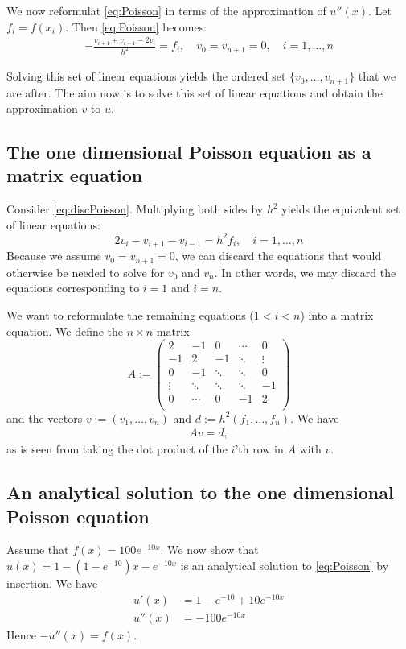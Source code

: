 \documentclass[a4paper,10pt]{scrartcl}\sloppy
\theoremstyle{definition}
\begin{document}
We now reformulat \cref{eq:Poisson} in terms of  the approximation of $u''(x)$. Let  $f_i=f(x_i)$. Then \cref{eq:Poisson} becomes:
\begin{align}\label{eq:discPoisson}
-\frac{v_{i+1}+v_{i-1}-2v_i}{h^2}=f_i, \quad v_0= v_{n+1} = 0, \quad i=1,\ldots, n
\end{align}

\noindent Solving this set of linear equations yields the ordered set $\{v_0,\ldots,v_{n+1}\}$ that we are after. The aim now is to solve this set of linear equations and obtain the approximation $v$ to $u$.

\subsection{The one dimensional Poisson equation as a matrix equation}
\noindent  Consider \cref{eq:discPoisson}. Multiplying both sides by $h^2$ yields the equivalent set of linear equations: 
$$2v_i-v_{i+1}-v_{i-1}=h^2 f_i,  \quad i=1,\ldots, n$$
\noindent Because we assume $v_0=v_{n+1}=0$, we can discard the equations that would otherwise be needed to solve for $v_0$ and $v_n$. In other words, we may discard the equations corresponding to $i=1$ and $i=n$. 

We want to reformulate the remaining equations ($1<i<n$) into a matrix equation. We define the $n \times n$ matrix 
$$A:=   \begin{pmatrix}
   2 & -1 & 0 &\cdots   &0  \\
   -1 & 2 & -1 &\ddots   & \vdots \\
   0 & -1 & \ddots  &  \ddots   &0 \\
   \vdots &  \ddots &\ddots & \ddots &-1 \\
   0 & \cdots  &0  & -1  &2 \\
  \end{pmatrix}
$$
and the vectors $v:= (v_1,\ldots, v_n)$ and $d:=h^2(f_1,\ldots, f_n)$. We have 
\begin{align}\label{eq:Avb}
Av= d,
\end{align}
\noindent as is seen from taking the dot product of the $i$'th row in $A$ with $v$.


\subsection{An analytical solution to the one dimensional Poisson equation}

Assume that $f(x) = 100e^{-10x} $.  We now show that ${u(x) = 1-(1-e^{-10})x -e^{-10x}}$ is an analytical solution to \cref{eq:Poisson} by insertion. We have
\begin{align*}
u'(x) &= 1-e^{-10}+10e^{-10 x}\\
u''(x) &= -100e^{-10x}
\end{align*}
\noindent Hence $-u''(x)=f(x)$.
\end{document}
